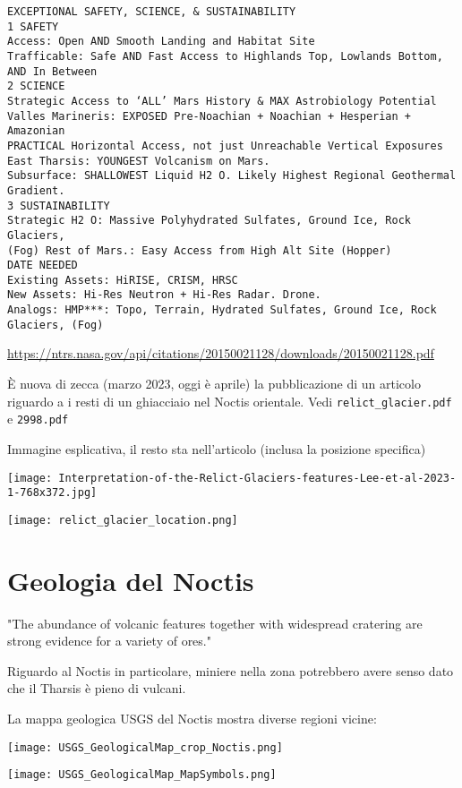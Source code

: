 \documentclass[a4paper,10pt,openany,oneside]{memoir}
\begin{document}
\begin{verbatim}
EXCEPTIONAL SAFETY, SCIENCE, & SUSTAINABILITY
1 SAFETY
Access: Open AND Smooth Landing and Habitat Site
Trafficable: Safe AND Fast Access to Highlands Top, Lowlands Bottom, 
AND In Between
2 SCIENCE
Strategic Access to ‘ALL’ Mars History & MAX Astrobiology Potential
Valles Marineris: EXPOSED Pre-Noachian + Noachian + Hesperian + Amazonian
PRACTICAL Horizontal Access, not just Unreachable Vertical Exposures
East Tharsis: YOUNGEST Volcanism on Mars.
Subsurface: SHALLOWEST Liquid H2 O. Likely Highest Regional Geothermal 
Gradient.
3 SUSTAINABILITY
Strategic H2 O: Massive Polyhydrated Sulfates, Ground Ice, Rock Glaciers, 
(Fog) Rest of Mars.: Easy Access from High Alt Site (Hopper)
DATE NEEDED
Existing Assets: HiRISE, CRISM, HRSC
New Assets: Hi-Res Neutron + Hi-Res Radar. Drone.
Analogs: HMP***: Topo, Terrain, Hydrated Sulfates, Ground Ice, Rock 
Glaciers, (Fog)
\end{verbatim}

\url{https://ntrs.nasa.gov/api/citations/20150021128/downloads/20150021128.pdf}

È nuova di zecca (marzo 2023, oggi è aprile) la pubblicazione di un articolo riguardo a i resti di un ghiacciaio nel Noctis orientale. Vedi \texttt{relict\_glacier.pdf} e \texttt{2998.pdf}


Immagine esplicativa, il resto sta nell'articolo (inclusa la posizione specifica)

\texttt{[image: Interpretation-of-the-Relict-Glaciers-features-Lee-et-al-2023-1-768x372.jpg]}

\texttt{[image: relict\_glacier\_location.png]}


\section{Geologia del Noctis}

"The abundance of volcanic features together with widespread cratering are strong evidence for a variety of ores."

Riguardo al Noctis in particolare, miniere nella zona potrebbero avere senso dato che il Tharsis è pieno di vulcani.

La mappa geologica USGS del Noctis mostra diverse regioni vicine:

\texttt{[image: USGS\_GeologicalMap\_crop\_Noctis.png]}

\texttt{[image: USGS\_GeologicalMap\_MapSymbols.png]}
\end{document}
